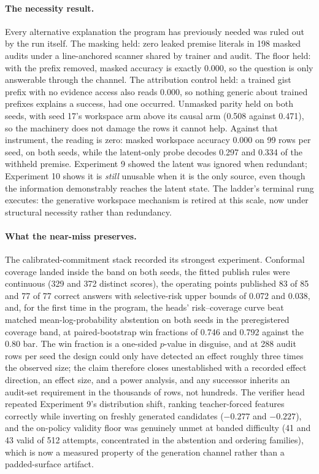 \documentclass[10pt,a4paper]{article}
\begin{document}
\paragraph{The necessity result.}
Every alternative explanation the program has previously needed was ruled
out by the run itself. The masking held: zero leaked premise literals in 198
masked audits under a line-anchored scanner shared by trainer and audit. The
floor held: with the prefix removed, masked accuracy is exactly 0.000, so
the question is only answerable through the channel. The attribution control
held: a trained gist prefix with no evidence access also reads 0.000, so
nothing generic about trained prefixes explains a success, had one occurred.
Unmasked parity held on both seeds, with seed 17's workspace arm above its
causal arm (0.508 against 0.471), so the machinery does not damage the rows
it cannot help. Against that instrument, the reading is zero: masked
workspace accuracy 0.000 on 99 rows per seed, on both seeds, while the
latent-only probe decodes 0.297 and 0.334 of the withheld premise. Experiment 9
showed the latent was ignored when redundant; Experiment 10 shows it is
\emph{still} unusable when it is the only source, even though the
information demonstrably reaches the latent state. The ladder's terminal
rung executes: the generative workspace mechanism is retired at this scale,
now under structural necessity rather than redundancy.

\paragraph{What the near-miss preserves.}
The calibrated-commitment stack recorded its strongest experiment. Conformal
coverage landed inside the band on both seeds, the fitted publish rules were
continuous (329 and 372 distinct scores), the operating points published 83
of 85 and 77 of 77 correct answers with selective-risk upper bounds of 0.072
and 0.038, and, for the first time in the program, the heads' risk--coverage
curve beat matched mean-log-probability abstention on both seeds in the
preregistered coverage band, at paired-bootstrap win fractions of 0.746 and
0.792 against the 0.80 bar. The win fraction is a one-sided $p$-value in
disguise, and at 288 audit rows per seed the design could only have detected
an effect roughly three times the observed size; the claim therefore closes
unestablished with a recorded effect direction, an effect size, and a power
analysis, and any successor inherits an audit-set requirement in the
thousands of rows, not hundreds. The verifier head repeated Experiment 9's
distribution shift, ranking teacher-forced features correctly while
inverting on freshly generated candidates ($-0.277$ and $-0.227$), and the
on-policy validity floor was genuinely unmet at banded difficulty (41 and 43
valid of 512 attempts, concentrated in the abstention and ordering
families), which is now a measured property of the generation channel rather
than a padded-surface artifact.
\end{document}
